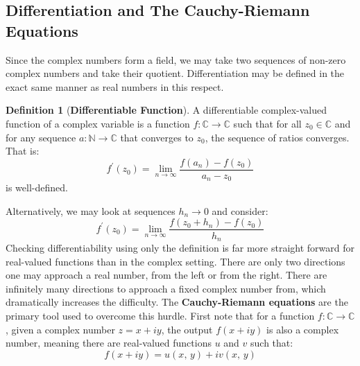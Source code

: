 \documentclass{article}
\theoremstyle{definition}
\newtheorem{definition}{Definition}[section]
\begin{document}
        \subsection{Differentiation and The Cauchy-Riemann Equations}
            Since the complex numbers form a field, we may take two sequences
            of non-zero complex numbers and take their quotient. Differentiation
            may be defined in the exact same manner as real numbers in this
            respect.
            \begin{definition}[\textbf{Differentiable Function}]
                A differentiable complex-valued function of a complex variable
                is a function $f:\mathbb{C}\rightarrow\mathbb{C}$ such that
                for all $z_{0}\in\mathbb{C}$ and for any sequence
                $a:\mathbb{N}\rightarrow\mathbb{C}$ that converges to
                $z_{0}$, the sequence of ratios converges. That is:
                \begin{equation}
                    f^{\prime}(z_{0})
                    =\lim_{n\rightarrow\infty}
                    \frac{f(a_{n})-f(z_{0})}{a_{n}-z_{0}}
                \end{equation}
                is well-defined.
            \end{definition}
            Alternatively, we may look at sequences $h_{n}\rightarrow{0}$
            and consider:
            \begin{equation}
                f^{\prime}(z_{0})
                =\lim_{n\rightarrow\infty}
                \frac{f(z_{0}+h_{n})-f(z_{0})}{h_{n}}
            \end{equation}
            Checking differentiability using only the definition is far more
            straight forward for real-valued functions than in the complex
            setting. There are only two directions one may approach a real
            number, from the left or from the right. There are infinitely
            many directions to approach a fixed complex number from, which
            dramatically increases the difficulty. The
            \textbf{Cauchy-Riemann equations} are the primary tool used to
            overcome this hurdle. First note that for a function
            $f:\mathbb{C}\rightarrow\mathbb{C}$, given a complex number
            $z=x+iy$, the output $f(x+iy)$ is also a complex number, meaning
            there are real-valued functions $u$ and $v$ such that:
            \begin{equation}
                f(x+iy)=u(x,\,y)+iv(x,\,y)
            \end{equation}
\end{document}
